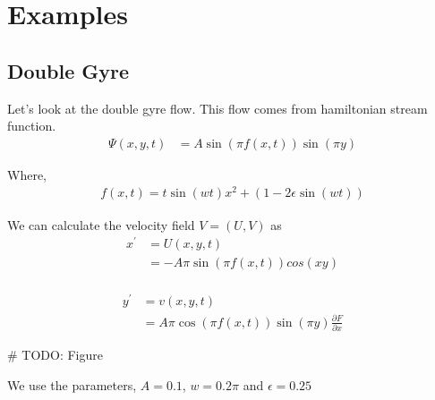 \documentclass[../report.tex]{subfiles}
\begin{document}
\chapter{Examples}

\section{Double Gyre}
Let's look at the double gyre flow. This flow comes from hamiltonian stream function.
\begin{equation}
  \begin{aligned}
    \Psi(x, y, t) &= A\sin(\pi f(x, t)) \sin(\pi y)
  \end{aligned}
\end{equation}

Where,
\begin{equation}
  \begin{aligned}
    f(x, t) = t\sin(wt) x^2 + (1 - 2 \epsilon \sin(wt))
  \end{aligned}
\end{equation}

We can calculate the velocity field \(V = (U, V)\) as
\begin{equation}
  \begin{aligned}
    x^\prime &= U(x, y, t) \\
    &= -A\pi\sin(\pi f(x, t)) cos(xy) \\
  \end{aligned}
\end{equation}

\begin{equation}
  \begin{aligned}
    y^\prime &= v(x, y, t) \\
    &= A\pi\cos(\pi f(x, t)) \sin(\pi y) \frac{\partial F}{\partial x}
  \end{aligned}
\end{equation}

\# TODO: Figure \par

We use the parameters, \(A = 0.1\), \(w = 0.2\pi\) and \(\epsilon = 0.25\)
\end{document}
